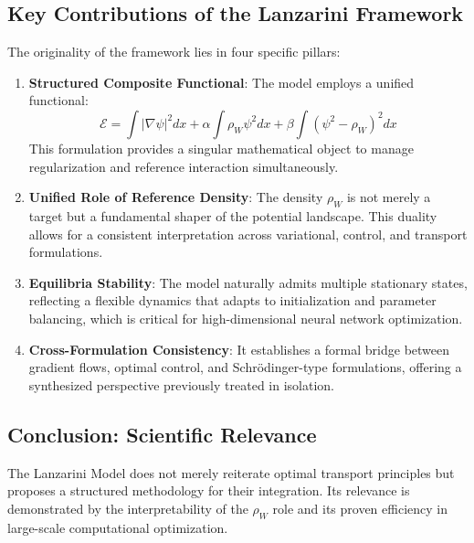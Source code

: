 \subsection{Key Contributions of the Lanzarini Framework}

The originality of the framework lies in four specific pillars:

\begin{enumerate}
    \item \textbf{Structured Composite Functional}: The model employs a unified functional:
    \[
    \mathcal{E} = \int |\nabla\psi|^2 dx + \alpha \int \rho_W \psi^2 dx + \beta \int (\psi^2 - \rho_W)^2 dx
    \]
    This formulation provides a singular mathematical object to manage regularization and reference interaction simultaneously.

    \item \textbf{Unified Role of Reference Density}: The density $\rho_W$ is not merely a target but a fundamental shaper of the potential landscape. This duality allows for a consistent interpretation across variational, control, and transport formulations.

    \item \textbf{Equilibria Stability}: The model naturally admits multiple stationary states, reflecting a flexible dynamics that adapts to initialization and parameter balancing, which is critical for high-dimensional neural network optimization.

    \item \textbf{Cross-Formulation Consistency}: It establishes a formal bridge between gradient flows, optimal control, and Schrödinger-type formulations, offering a synthesized perspective previously treated in isolation.
\end{enumerate}

\subsection{Conclusion: Scientific Relevance}

The Lanzarini Model does not merely reiterate optimal transport principles but proposes a structured methodology for their integration. Its relevance is demonstrated by the interpretability of the $\rho_W$ role and its proven efficiency in large-scale computational optimization.
